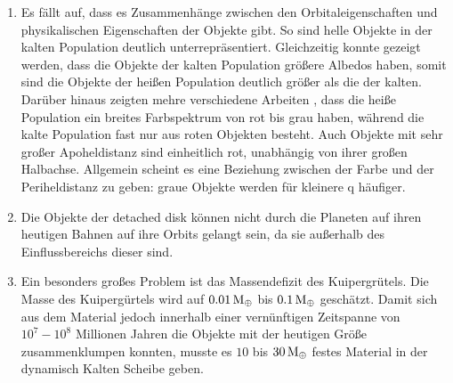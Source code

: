 \documentclass[12pt,a4paper,twoside]{article}
\renewcommand{\cite}{\citep}
\newcommand{\ME}{M_\oplus}
\begin{document}
\begin{enumerate}
\item Es fällt auf, dass es Zusammenhänge zwischen den Orbitaleigenschaften und physikalischen Eigenschaften der Objekte gibt. So sind helle Objekte in der kalten Population deutlich unterrepräsentiert\cite{Levison2001a}. Gleichzeitig konnte gezeigt werden, dass die Objekte der kalten Population größere Albedos haben, somit sind die Objekte der heißen Population deutlich größer als die der kalten\cite{Grundy2005}.
Darüber hinaus zeigten mehre verschiedene Arbeiten \cite{Tegler2000,Doressoundiram2001,Trujillo2002,Doressoundiram2005,Elliot2005,Levison2008}, dass die heiße Population ein breites Farbspektrum von rot bis grau haben, während die kalte Population fast nur aus roten Objekten besteht.
Auch Objekte mit sehr großer Apoheldistanz sind einheitlich rot, unabhängig von ihrer großen Halbachse.
Allgemein scheint es eine Beziehung zwischen der Farbe und der Periheldistanz zu geben: graue Objekte werden für kleinere q häufiger.
\item Die Objekte der detached disk können nicht durch die Planeten auf ihren heutigen Bahnen auf ihre Orbits gelangt sein, da sie außerhalb des Einflussbereichs dieser sind. %
\item Ein besonders großes Problem ist das Massendefizit des Kuipergrütels. Die Masse des Kuipergürtels wird auf $\unit[0.01]{\ME}$ bis $\unit[0.1]{\ME}$ geschätzt\cite{Gladman2001, Bernstein2004, Levison2008}.
Damit sich aus dem Material jedoch innerhalb einer vernünftigen Zeitspanne von $10^7-10^8$ Millionen Jahren die Objekte mit der heutigen Größe zusammenklumpen konnten, musste es $10$ bis $\unit[30]{\ME}$ festes Material in der dynamisch Kalten Scheibe geben.\cite{Stern1996AJ, Stern1997AJ, Stern1997ApJ, Kenyon1998AJ, Kenyon1999AJ, Kenyon1999ApJ, Kenyon2004}
\end{enumerate} %
\end{document}
